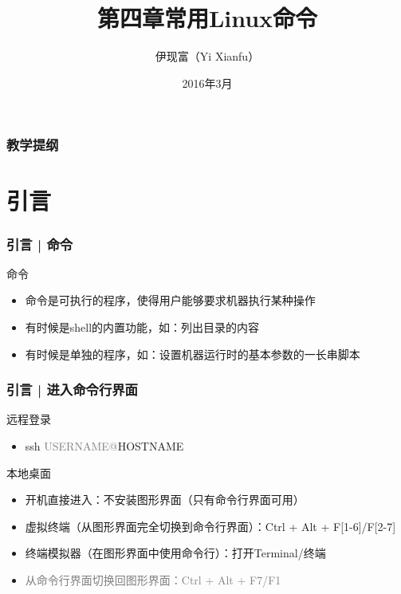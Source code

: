 



\title[常用Linux命令]{第四章\quad 常用Linux命令}
\author[Yixf]{伊现富（Yi Xianfu）}
\date{2016年3月}


\begin{frame}
  \titlepage
\end{frame}

\begin{frame}[plain,label=current]
  \frametitle{教学提纲}
  \setcounter{tocdepth}{3}
  \begin{multicols}{2}
    \tableofcontents
  \end{multicols}
\end{frame}


\section{引言}
\begin{frame}
  \frametitle{引言 | 命令}
  \begin{block}{命令}
    \begin{itemize}
      \item 命令是可执行的程序，使得用户能够要求机器执行某种操作
      \item 有时候是shell的内置功能，如：列出目录的内容
      \item 有时候是单独的程序，如：设置机器运行时的基本参数的一长串脚本
    \end{itemize}
  \end{block}
\end{frame}

\begin{frame}
  \frametitle{引言 | \alert{进入命令行界面}}
  \begin{block}{远程登录}
    \begin{itemize}
      \item ssh \textcolor{gray}{USERNAME@}HOSTNAME
    \end{itemize}
  \end{block}
  \pause
  \begin{block}{本地桌面}
    \begin{itemize}
      \item 开机直接进入：不安装图形界面（只有命令行界面可用）
      \item 虚拟终端（从图形界面完全切换到命令行界面）：Ctrl + Alt + F[1-6]/F[2-7]
      \item 终端模拟器（在图形界面中使用命令行）：打开Terminal/终端
      \item \textcolor{gray}{从命令行界面切换回图形界面：Ctrl + Alt + F7/F1}
    \end{itemize}
  \end{block}
\end{frame}


